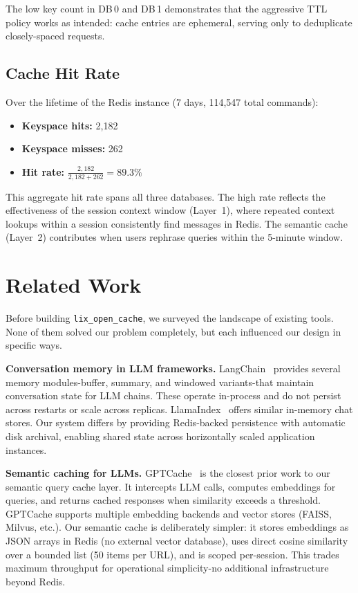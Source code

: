 \documentclass[conference]{IEEEtran}
\begin{document}
The low key count in DB\,0 and DB\,1 demonstrates that the aggressive TTL policy works as intended: cache entries are ephemeral, serving only to deduplicate closely-spaced requests.

\subsection{Cache Hit Rate}

Over the lifetime of the Redis instance (7 days, 114{,}547 total commands):

\begin{itemize}
\item \textbf{Keyspace hits:} 2{,}182
\item \textbf{Keyspace misses:} 262
\item \textbf{Hit rate:} $\frac{2{,}182}{2{,}182 + 262} = \mathbf{89.3\%}$
\end{itemize}

This aggregate hit rate spans all three databases. The high rate reflects the effectiveness of the session context window (Layer~1), where repeated context lookups within a session consistently find messages in Redis. The semantic cache (Layer~2) contributes when users rephrase queries within the 5-minute window.

\section{Related Work}
\label{sec:related}

Before building \texttt{lix\_open\_cache}, we surveyed the landscape of existing tools. None of them solved our problem completely, but each influenced our design in specific ways.

\textbf{Conversation memory in LLM frameworks.}
LangChain~\cite{langchain2023} provides several memory modules-buffer, summary, and windowed variants-that maintain conversation state for LLM chains. These operate in-process and do not persist across restarts or scale across replicas. LlamaIndex~\cite{llamaindex2023} offers similar in-memory chat stores. Our system differs by providing Redis-backed persistence with automatic disk archival, enabling shared state across horizontally scaled application instances.

\textbf{Semantic caching for LLMs.}
GPTCache~\cite{gptcache2023} is the closest prior work to our semantic query cache layer. It intercepts LLM calls, computes embeddings for queries, and returns cached responses when similarity exceeds a threshold. GPTCache supports multiple embedding backends and vector stores (FAISS, Milvus, etc.). Our semantic cache is deliberately simpler: it stores embeddings as JSON arrays in Redis (no external vector database), uses direct cosine similarity over a bounded list (50 items per URL), and is scoped per-session. This trades maximum throughput for operational simplicity-no additional infrastructure beyond Redis.
\end{document}
